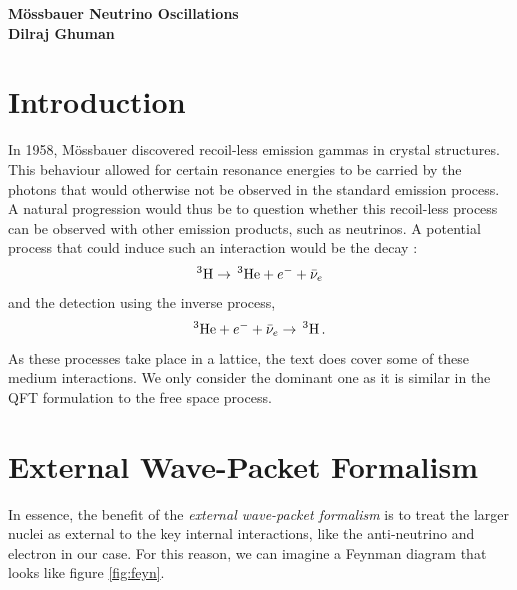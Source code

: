\documentclass[10pt]{article}
\begin{document}
\begin{center}
  {\Large \bf M\"{o}ssbauer Neutrino Oscillations}\\
  {\small \bf Dilraj Ghuman}
\end{center}
\vspace{2em}

\section{Introduction}

In 1958, M\"{o}ssbauer discovered recoil-less emission gammas in crystal structures. This behaviour allowed for certain resonance energies to be carried by the photons that would otherwise not be observed in the standard emission process. A natural progression would thus be to question whether this recoil-less process can be observed with other emission products, such as neutrinos. A potential process that could induce such an interaction would be the decay :
\[^{3} \textnormal{H} \to\,  ^{3}\textnormal{He} + e^{-} + \bar{\nu}_{e}\]
and the detection using the inverse process,
\[^{3}\textnormal{He} + e^{-} + \bar{\nu}_{e} \to\, ^{3} \textnormal{H}\, .\]
As these processes take place in a lattice, the text \cite{Akhmedov_2008} does cover some of these medium interactions. We only consider the dominant one as it is similar in the QFT formulation to the free space process. 

\section{External Wave-Packet Formalism}
In essence, the benefit of the \textit{external wave-packet formalism} is to treat the larger nuclei as external to the key internal interactions, like the anti-neutrino and electron in our case. For this reason, we can imagine a Feynman diagram that looks like figure \ref{fig:feyn}.

\end{document}
